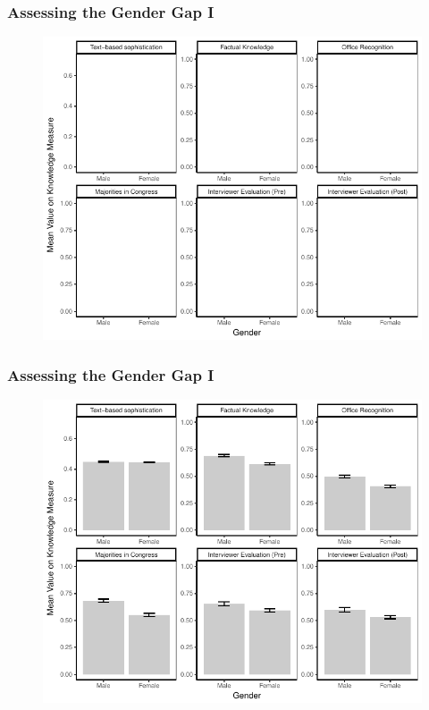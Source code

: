 \documentclass{beamer}
\begin{document}
\begin{frame} %
\frametitle{Assessing the Gender Gap I}
  \begin{figure}
  \includegraphics[height = .9\textheight]{../fig/meandiff_empty.pdf}
  \end{figure}
\end{frame}
\begin{frame} %
\frametitle{Assessing the Gender Gap I}
  \begin{figure}
  \includegraphics[height = .9\textheight]{../fig/meandiff_small.pdf}
  \end{figure}
\end{frame}
\end{document}

